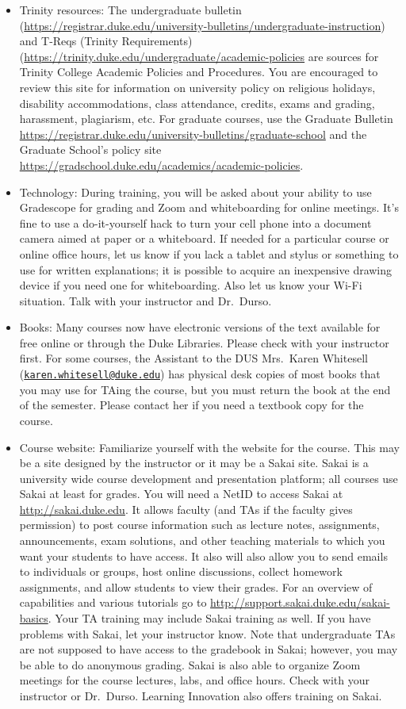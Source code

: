 \documentclass[
]{article}
\begin{document}
\begin{itemize}
\item
  Trinity resources: The undergraduate bulletin (\url{https://registrar.duke.edu/university-bulletins/undergraduate-instruction}) and T-Reqs (Trinity Requirements) (\url{https://trinity.duke.edu/undergraduate/academic-policies} are sources for Trinity College Academic Policies and Procedures. You are encouraged to review this site for information on university policy on religious holidays, disability accommodations, class attendance, credits, exams and grading, harassment, plagiarism, etc. For graduate courses, use the Graduate Bulletin \url{https://registrar.duke.edu/university-bulletins/graduate-school} and the Graduate School's policy site \url{https://gradschool.duke.edu/academics/academic-policies}.
\item
  Technology: During training, you will be asked about your ability to use Gradescope for grading and Zoom and whiteboarding for online meetings. It's fine to use a do-it-yourself hack to turn your cell phone into a document camera aimed at paper or a whiteboard. If needed for a particular course or online office hours, let us know if you lack a tablet and stylus or something to use for written explanations; it is possible to acquire an inexpensive drawing device if you need one for whiteboarding. Also let us know your Wi-Fi situation. Talk with your instructor and Dr.~Durso.
\item
  Books: Many courses now have electronic versions of the text available for free online or through the Duke Libraries. Please check with your instructor first. For some courses, the Assistant to the DUS Mrs.~Karen Whitesell (\href{mailto:karen.whitesell@duke.edu}{\nolinkurl{karen.whitesell@duke.edu}}) has physical desk copies of most books that you may use for TAing the course, but you must return the book at the end of the semester. Please contact her if you need a textbook copy for the course.
\item
  Course website: Familiarize yourself with the website for the course. This may be a site designed by the instructor or it may be a Sakai site. Sakai is a university wide course development and presentation platform; all courses use Sakai at least for grades. You will need a NetID to access Sakai at \url{http://sakai.duke.edu}. It allows faculty (and TAs if the faculty gives permission) to post course information such as lecture notes, assignments, announcements, exam solutions, and other teaching materials to which you want your students to have access. It also will also allow you to send emails to individuals or groups, host online discussions, collect homework assignments, and allow students to view their grades. For an overview of capabilities and various tutorials go to \url{http://support.sakai.duke.edu/sakai-basics}. Your TA training may include Sakai training as well. If you have problems with Sakai, let your instructor know. Note that undergraduate TAs are not supposed to have access to the gradebook in Sakai; however, you may be able to do anonymous grading. Sakai is also able to organize Zoom meetings for the course lectures, labs, and office hours. Check with your instructor or Dr.~Durso. Learning Innovation also offers training on Sakai.

\end{itemize}
\end{document}
